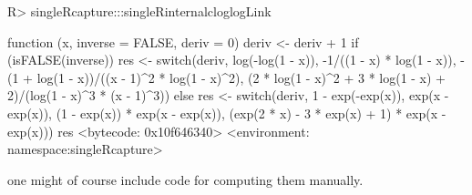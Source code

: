 \documentclass[
]{jss}
\newcommand{\1}{\mathcal{I}} \newcommand{\bZero}{\boldsymbol{0}}
\begin{document}
\begin{CodeChunk}
\begin{CodeInput}
R> singleRcapture:::singleRinternalcloglogLink
\end{CodeInput}
\begin{CodeOutput}
function (x, inverse = FALSE, deriv = 0) 
{
    deriv <- deriv + 1
    if (isFALSE(inverse)) {
        res <- switch(deriv, log(-log(1 - x)), -1/((1 - x) * 
            log(1 - x)), -(1 + log(1 - x))/((x - 1)^2 * log(1 - 
            x)^2), (2 * log(1 - x)^2 + 3 * log(1 - x) + 2)/(log(1 - 
            x)^3 * (x - 1)^3))
    }
    else {
        res <- switch(deriv, 1 - exp(-exp(x)), exp(x - exp(x)), 
            (1 - exp(x)) * exp(x - exp(x)), (exp(2 * x) - 3 * 
                exp(x) + 1) * exp(x - exp(x)))
    }
    res
}
<bytecode: 0x10f646340>
<environment: namespace:singleRcapture>
\end{CodeOutput}
\end{CodeChunk}

\normalsize

one might of course include code for computing them manually.


\end{document}
